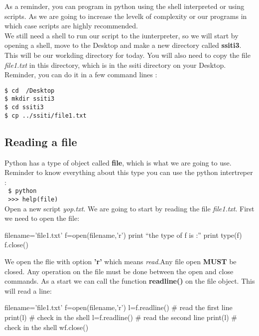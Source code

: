 \documentclass[article,10pt]{scrartcl}
\begin{document}
As a reminder, you can program in python using the shell interpreted or using scripts. As we are going to increase the levelk of complexity or our programs in which case scripts are highly recommended.
\\
We still need a shell to run our script to the iunterpreter, so we will start by opening a shell, move to the Desktop and make a new directory called \textbf{ssiti3}. This will be our workding directory for today. You will also need to copy the file \textit{file1.txt} in this directory, which is in the ssiti directory on your Desktop.\\
Reminder, you can do it in a few command lines :

\texttt{\$ cd ~/Desktop}\\
\texttt{\$ mkdir ssiti3}\\
\texttt{\$ cd ssiti3}\\
\texttt{\$ cp ../ssiti/file1.txt}\\
\subsection*{Reading a file}
Python has a type of object called \textbf{file}, which is what we are going to use. Reminder to know everything about this type you can use the python intertreper :\\
\texttt{ \$ python}\\
\texttt{ >>> help(file)}\\

Open a new script \textit{yop.txt}. We are going to start by reading the file \textit{file1.txt}. First we need to open the file:

\begin{python}
filename='file1.txt'
f=open(filename,'r')
print ``the type of f is :''
print type(f)
f.close()
\end{python}
We open the flie with option \textbf{'r'} which means \textit{read}.Any file open \textbf{MUST} be closed. Any operation on the file must be done between the open and close commands. As a start we can call the function \textbf{readline()} on the file object. This will read a line:
\begin{python}
filename='file1.txt'
f=open(filename,'r')
l=f.readline() # read the first line
print(l) # check in the shell
l=f.readline() # read the second line
print(l) # check in the shell
wf.close()
\end{python}
\end{document}
